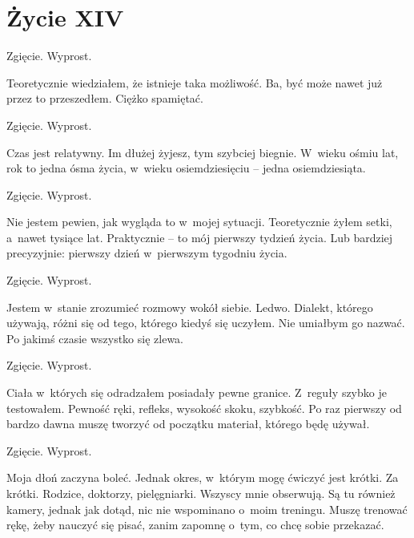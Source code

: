 \chapter{Życie XIV}

\begin{itquote}
Zgięcie. Wyprost.
\end{itquote}

Teoretycznie wiedziałem, że istnieje taka możliwość. Ba, być może nawet już przez to przeszedłem. Ciężko spamiętać.

\begin{itquote}
Zgięcie. Wyprost.
\end{itquote}

Czas jest relatywny. Im dłużej żyjesz, tym szybciej biegnie. W~wieku ośmiu lat, rok to jedna ósma życia, w~wieku osiemdziesięciu -- jedna osiemdziesiąta.

\begin{itquote}
Zgięcie. Wyprost.
\end{itquote}

Nie jestem pewien, jak wygląda to w~mojej sytuacji. Teoretycznie żyłem setki, a~nawet tysiące lat. Praktycznie -- to mój pierwszy tydzień życia. Lub bardziej precyzyjnie: pierwszy dzień w~pierwszym tygodniu życia.

\begin{itquote}
Zgięcie. Wyprost.
\end{itquote}

Jestem w~stanie zrozumieć rozmowy wokół siebie. Ledwo. Dialekt, którego używają, różni się od tego, którego kiedyś się uczyłem. Nie umiałbym go nazwać. Po jakimś czasie wszystko się zlewa.

\begin{itquote}
Zgięcie. Wyprost.
\end{itquote}

Ciała w~których się odradzałem posiadały pewne granice. Z~reguły szybko je testowałem. Pewność ręki, refleks, wysokość skoku, szybkość. Po raz pierwszy od bardzo dawna muszę tworzyć od początku materiał, którego będę używał.

\begin{itquote}
Zgięcie. Wyprost.
\end{itquote}

Moja dłoń zaczyna boleć. Jednak okres, w~którym mogę ćwiczyć jest krótki. Za krótki. Rodzice, doktorzy, pielęgniarki. Wszyscy mnie obserwują. Są tu również kamery, jednak jak dotąd, nic nie wspominano o~moim treningu. Muszę trenować rękę, żeby nauczyć się pisać, zanim zapomnę o~tym, co chcę sobie przekazać. 

